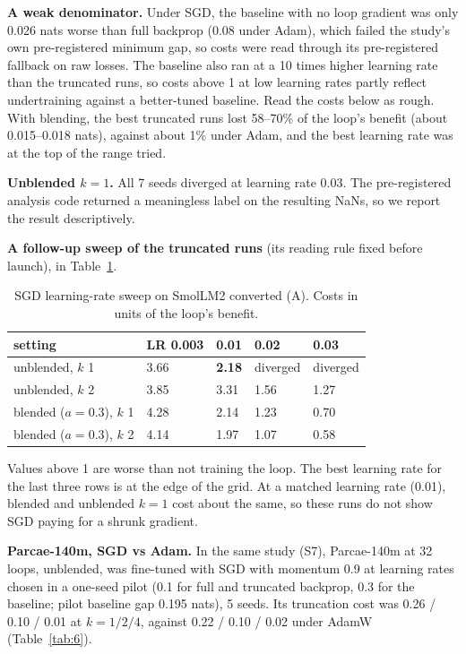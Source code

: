 \documentclass[10pt]{article}
\begin{document}
\textbf{A weak denominator.} Under SGD, the baseline with no loop gradient was only 0.026 nats worse than full backprop (0.08 under Adam), which failed the study's own pre-registered minimum gap, so costs were read through its pre-registered fallback on raw losses. The baseline also ran at a 10 times higher learning rate than the truncated runs, so costs above 1 at low learning rates partly reflect undertraining against a better-tuned baseline. Read the costs below as rough. With blending, the best truncated runs lost 58--70\% of the loop's benefit (about 0.015--0.018 nats), against about 1\% under Adam, and the best learning rate was at the top of the range tried.

\textbf{Unblended $k = 1$.} All 7 seeds diverged at learning rate 0.03. The pre-registered analysis code returned a meaningless label on the resulting NaNs, so we report the result descriptively.

\textbf{A follow-up sweep of the truncated runs} (its reading rule fixed before launch), in Table~\ref{tab:5}.

\begin{table}[!htbp]
\centering\small
\caption{SGD learning-rate sweep on SmolLM2 converted (A). Costs in units of the loop's benefit.}
\begin{tabular}{lllll}
\toprule
setting & LR 0.003 & 0.01 & 0.02 & 0.03 \\
\midrule
unblended, $k$ 1 & 3.66 & \textbf{2.18} & diverged & diverged \\
unblended, $k$ 2 & 3.85 & 3.31 & 1.56 & 1.27 \\
blended ($a = 0.3$), $k$ 1 & 4.28 & 2.14 & 1.23 & 0.70 \\
blended ($a = 0.3$), $k$ 2 & 4.14 & 1.97 & 1.07 & 0.58 \\
\bottomrule
\end{tabular}
\label{tab:5}
\end{table}


Values above 1 are worse than not training the loop. The best learning rate for the last three rows is at the edge of the grid. At a matched learning rate (0.01), blended and unblended $k = 1$ cost about the same, so these runs do not show SGD paying for a shrunk gradient.

\textbf{Parcae-140m, SGD vs Adam.} In the same study (S7), Parcae-140m at 32 loops, unblended, was fine-tuned with SGD with momentum 0.9 at learning rates chosen in a one-seed pilot (0.1 for full and truncated backprop, 0.3 for the baseline; pilot baseline gap 0.195 nats), 5 seeds. Its truncation cost was 0.26 / 0.10 / 0.01 at $k = 1 / 2 / 4$, against 0.22 / 0.10 / 0.02 under AdamW (Table~\ref{tab:6}).
\end{document}
